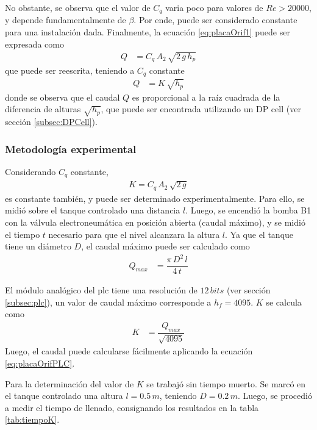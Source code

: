 No obstante, se observa que el valor de $C_q$ varia poco para valores de
$Re > 20000$, y depende fundamentalmente de $\beta$.
Por ende, puede ser considerado constante para una instalación dada.
Finalmente, la ecuación \eqref{eq:placaOrif1} puede ser expresada como
\begin{align}
 Q &= C_q\,A_2\, \sqrt{2\,g\,h_p}
\end{align}
que puede ser reescrita, teniendo a $C_q$ constante
\begin{align}
 Q &= K\,\sqrt{h_p}
 \label{eq:placaOrifPLC}
\end{align}
donde se observa que el caudal $Q$ es proporcional a la raíz cuadrada de
la diferencia de alturas $\sqrt{h_p}$, que puede
ser encontrada utilizando un DP cell (ver sección \ref{subsec:DPCell}).

\subsubsection{Metodología experimental}
Considerando $C_q$ constante,
\begin{align}
 K = C_q\, A_2\, \sqrt{2\,g}
\end{align}
es constante también, y puede ser determinado experimentalmente.
Para ello, se midió sobre el tanque controlado una distancia $l$.
Luego, se encendió la bomba B1 con la válvula electroneumática en posición
abierta (caudal máximo), y se midió el tiempo $t$ necesario para que el nivel
alcanzara la altura $l$.
Ya que el tanque tiene un diámetro $D$, el caudal máximo puede ser
calculado como
\begin{align}
 Q_{max} &= \dfrac{\pi\,D^2\,l}{4\,t}
\end{align}

El módulo analógico del \gls{plc} tiene una resolución de $12\,bits$
(ver sección \ref{subsec:plc}), un valor de caudal máximo corresponde a $h_f =
4095$.
$K$ se calcula como
\begin{align}
 K &= \dfrac{Q_{max}}{\sqrt{4095}}
\end{align}
Luego, el caudal puede calcularse fácilmente aplicando la ecuación
\eqref{eq:placaOrifPLC}.

Para la determinación del valor de $K$ se trabajó sin tiempo muerto.
Se marcó en el tanque controlado una altura $l=0.5\,m$, teniendo $D=0.2\,m$.
Luego, se procedió a medir el tiempo de llenado, consignando los resultados en
la tabla \ref{tab:tiempoK}.

